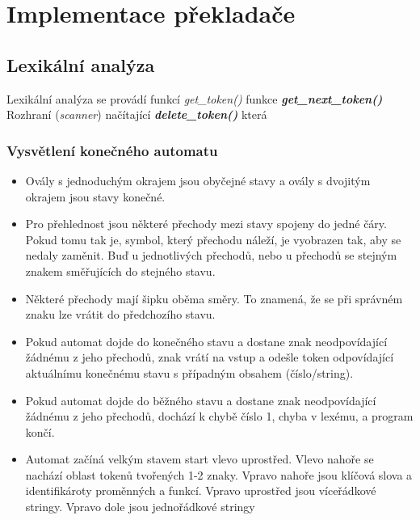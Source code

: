 \documentclass[a4paper, 12pt]{article}
\begin{document}
\newpage
{}
\section{Implementace překladače}
\subsection{Lexikální analýza}
Lexikální analýza se provádí funkcí \textit{get\_token()} 
funkce \textit{\textbf{get\_next\_token()}} Rozhraní (\textit{scanner}) načítající \newline
\textit{\textbf{delete\_token()}} která

\subsubsection{Vysvětlení konečného automatu}
\begin{itemize}
    \item Ovály s jednoduchým okrajem jsou obyčejné stavy a ovály s dvojitým okrajem jsou stavy konečné.
    \item Pro přehlednost jsou některé přechody mezi stavy spojeny do jedné čáry. Pokud tomu tak je, symbol, který přechodu náleží, je vyobrazen tak, aby se nedaly zaměnit. Buď u jednotlivých přechodů, nebo u přechodů se stejným znakem směřujících do stejného stavu. 
    \item Některé přechody mají šipku oběma směry. To znamená, že se při správném znaku lze vrátit do předchozího stavu.
    \item Pokud automat dojde do konečného stavu a dostane znak neodpovídající žádnému z jeho přechodů, znak vrátí na vstup a odešle token odpovídající aktuálnímu konečnému stavu s případným obsahem (číslo/string).
    \item Pokud automat dojde do běžného stavu a dostane znak neodpovídající žádnému z jeho přechodů, dochází k chybě číslo 1, chyba v lexému, a program končí.
    \item Automat začíná velkým stavem start vlevo uprostřed. Vlevo nahoře se nachází oblast tokenů tvořených 1-2 znaky. Vpravo nahoře jsou klíčová slova a identifikároty proměnných a funkcí. Vpravo uprostřed jsou víceřádkové stringy. Vpravo dole jsou jednořádkové stringy
\end{itemize}
\end{document}
